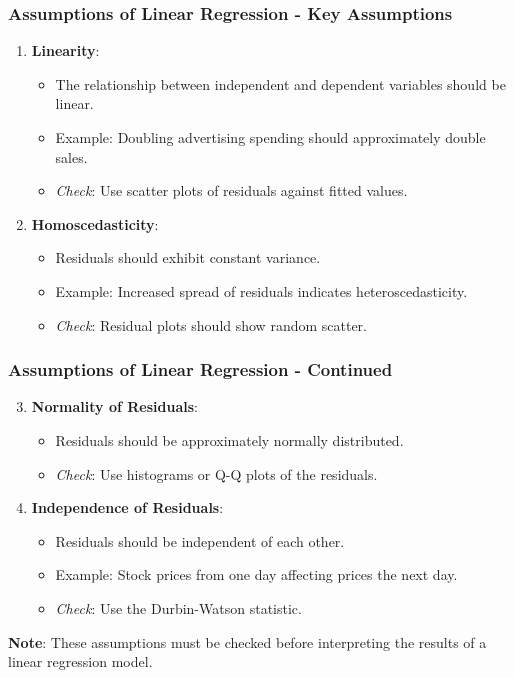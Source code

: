 \documentclass[aspectratio=169]{beamer}
\begin{document}
\begin{frame}[fragile]
    \frametitle{Assumptions of Linear Regression - Key Assumptions}
    \begin{enumerate}
        \item \textbf{Linearity}:
        \begin{itemize}
            \item The relationship between independent and dependent variables should be linear.
            \item Example: Doubling advertising spending should approximately double sales.
            \item \textit{Check}: Use scatter plots of residuals against fitted values.
        \end{itemize}
        
        \item \textbf{Homoscedasticity}:
        \begin{itemize}
            \item Residuals should exhibit constant variance.
            \item Example: Increased spread of residuals indicates heteroscedasticity.
            \item \textit{Check}: Residual plots should show random scatter.
        \end{itemize}
    \end{enumerate}
\end{frame}

\begin{frame}[fragile]
    \frametitle{Assumptions of Linear Regression - Continued}
    \begin{enumerate}
        \setcounter{enumi}{2} %
        \item \textbf{Normality of Residuals}:
        \begin{itemize}
            \item Residuals should be approximately normally distributed.
            \item \textit{Check}: Use histograms or Q-Q plots of the residuals.
        \end{itemize}

        \item \textbf{Independence of Residuals}:
        \begin{itemize}
            \item Residuals should be independent of each other.
            \item Example: Stock prices from one day affecting prices the next day.
            \item \textit{Check}: Use the Durbin-Watson statistic.
        \end{itemize}
    \end{enumerate}
    
    \textbf{Note}: These assumptions must be checked before interpreting the results of a linear regression model.
\end{frame}
\end{document}
